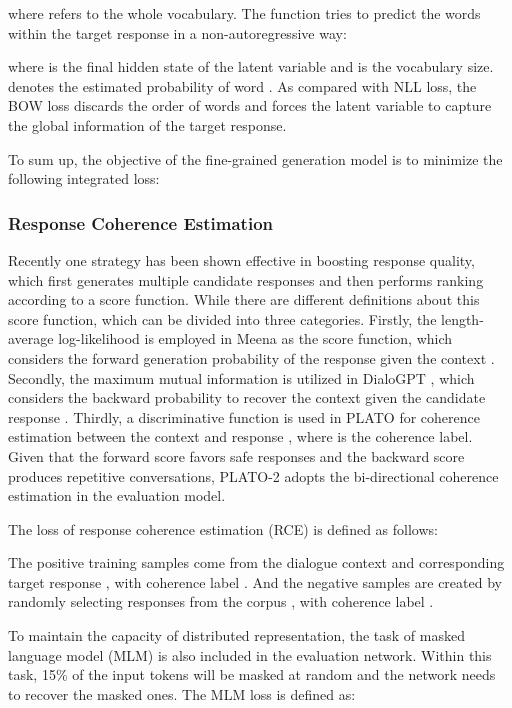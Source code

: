 \documentclass[11pt,a4paper]{article}
\begin{document}
	where  refers to the whole vocabulary. The function  tries to predict the words within the target response in a non-autoregressive way:
	
	where  is the final hidden state of the latent variable and  is the vocabulary size.  denotes the estimated probability of word . As compared with NLL loss, the BOW loss discards the order of words and forces the latent variable to capture the global information of the target response.
	
	To sum up, the objective of the fine-grained generation model is to minimize the following integrated loss:
	
	
	\subsubsection{Response Coherence Estimation}
	Recently one strategy has been shown effective in boosting response quality, which first generates multiple candidate responses and then performs ranking according to a score function. While there are different definitions about this score function, which can be divided into three categories. Firstly, the length-average log-likelihood is employed in Meena \cite{adiwardana2020towards} as the score function, which considers the forward generation probability of the response given the context . Secondly, the maximum mutual information is utilized in DialoGPT \cite{zhang2019dialogpt}, which considers the backward probability to recover the context given the candidate response . Thirdly, a discriminative function is used in PLATO \cite{bao2019plato} for coherence estimation between the context and response , where  is the coherence label. Given that the forward score favors safe responses and the backward score produces repetitive conversations, PLATO-2 adopts the bi-directional coherence estimation in the evaluation model.
	
	The loss of response coherence estimation (RCE) is defined as follows:
	
	The positive training samples come from the dialogue context and corresponding target response , with coherence label . And the negative samples are created by randomly selecting responses from the corpus , with coherence label .
	
	To maintain the capacity of distributed representation, the task of masked language model (MLM) \cite{devlin2019bert} is also included in the evaluation network. Within this task, 15\% of the input tokens will be masked at random and the network needs to recover the masked ones. The MLM loss is defined as:
	
\end{document}
